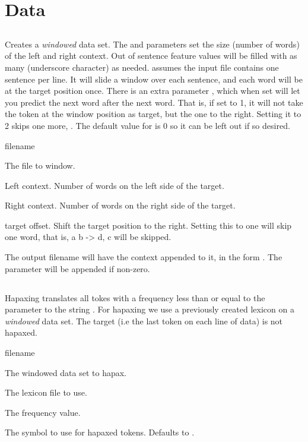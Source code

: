 \documentclass[a4paper,10pt,twoside]{report}
\begin{document}
\section{Data}

\subsection{}

Creates a \emph{windowed} data set. The  and 
parameters set the size (number of words) of the left and right
context. Out of sentence feature values will be filled with as many
\cmp{\_} (underscore character) as needed. \Wopr{} assumes the input
file contains one sentence per line. It will slide a window over each
sentence, and each word will be at the target position once. There is
an extra parameter , which when set will let you predict the
next word after the next word. That is, if set to \num{1}, it will not
take the token at the window position as target, but the one to the
right. Setting it to \num{2} skips one more, \etc{}. The default value
for  is 0 so it can be left out if so desired.

\begin{varlist}{filename}
\item[filename] The file to window.
\item[lc] Left context. Number of words on the left side of the target.
\item[rc] Right context. Number of words on the right side of the target.
\item[to] target offset. Shift the target position to the right. Setting this to
  one will skip one word, that is, a b -> d, c will be skipped.
\end{varlist}

The output filename will have the context appended to it, in the form
. The  parameter will be appended if non-zero.

\subsection{}

Hapaxing translates all tokes with a frequency less than or equal to
the  parameter to the string . For hapaxing we use
a previously created lexicon on a \emph{windowed} data set. The target
(i.e the last token on each line of data) is not hapaxed.

\begin{varlist}{filename}
\item[filename] The windowed data set to hapax.
\item[lexicon] The lexicon file to use.
\item[hpx] The frequency value.
\item[hpx\_sym] The symbol to use for hapaxed tokens. Defaults to
  . 
\end{varlist}
\end{document}
